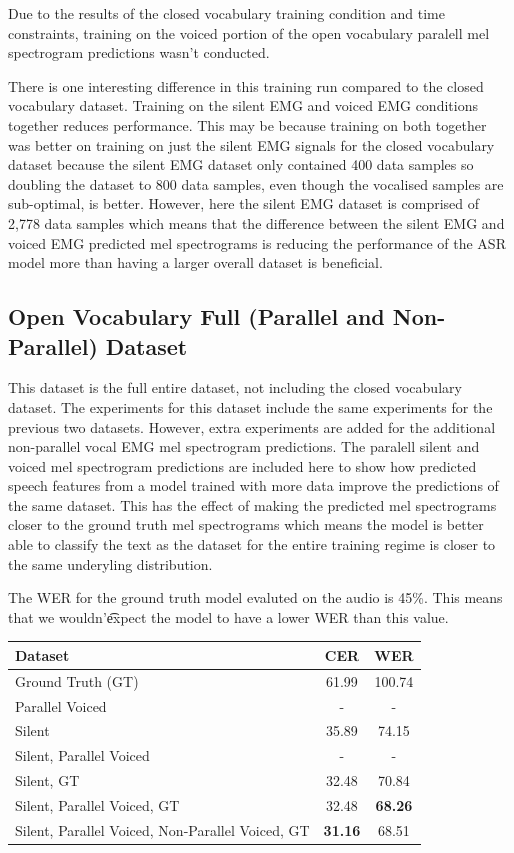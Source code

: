 Due to the results of the closed vocabulary training condition and time constraints,
training on the voiced portion of the open vocabulary paralell mel spectrogram
predictions wasn't conducted.

There is one interesting difference in this training run compared to the closed
vocabulary dataset. Training on the silent EMG and voiced EMG conditions together
reduces performance. This may be because training on both together was better
on training on just the silent EMG signals for the closed vocabulary dataset
because the silent EMG dataset only contained 400 data samples so doubling
the dataset to 800 data samples, even though the vocalised samples are sub-optimal,
is better. However, here the silent EMG dataset is comprised of 2,778 data samples
which means that the difference between the silent EMG and voiced EMG predicted
mel spectrograms is reducing the performance of the ASR model more than having a
larger overall dataset is beneficial.

\subsection{Open Vocabulary Full (Parallel and Non-Parallel) Dataset}

This dataset is the full entire dataset, not including the closed vocabulary
dataset. The experiments for this dataset include the same experiments for
the previous two datasets. However, extra experiments are added for the additional
non-parallel vocal EMG mel spectrogram predictions. The paralell silent and voiced
mel spectrogram predictions are included here to show how predicted speech features
from a model trained with more data improve the predictions of the same dataset.
This has the effect of making the predicted mel spectrograms closer to the ground
truth mel spectrograms which means the model is better able to classify the text
as the dataset for the entire training regime is closer to the same underyling distribution.

The WER for the ground truth model evaluted on the audio is 45\%. This means that we wouldn'\t
expect the model to have a lower WER than this value.

{\small\begin{center}
\begin{tabular} {  l  c  c  }
\hline
\textbf{Dataset} & \textbf{CER} & \textbf{WER} \\
\hline
Ground Truth (GT) & 61.99 & 100.74 \\
Parallel Voiced & - & - \\
Silent & 35.89 & 74.15 \\
Silent, Parallel Voiced & - & - \\
Silent, GT & 32.48 & 70.84 \\
\hline
Silent, Parallel Voiced, GT & 32.48 & \textbf{68.26} \\
Silent, Parallel Voiced, Non-Parallel Voiced, GT & \textbf{31.16} & 68.51 \\
\hline
\end{tabular}
\end{center}}

